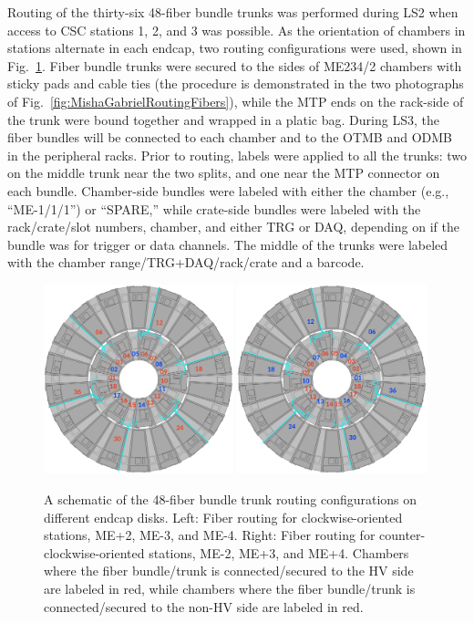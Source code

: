 Routing of the thirty-six 48-fiber bundle trunks was performed during LS2 when access to CSC stations 1, 2, and 3 was possible. As the orientation of chambers in stations alternate in each endcap, two routing configurations were used, shown in Fig.~\ref{fig:fiberrouting}. Fiber bundle trunks were secured to the sides of ME234/2 chambers with sticky pads and cable ties (the procedure is demonstrated in the two photographs of Fig.~\ref{fig:MishaGabrielRoutingFibers}), while the MTP ends on the rack-side of the trunk were bound together and wrapped in a platic bag. During LS3, the fiber bundles will be connected to each chamber and to the OTMB and ODMB in the peripheral racks. Prior to routing, labels were applied to all the trunks: two on the middle trunk near the two splits, and one near the MTP connector on each bundle. Chamber-side bundles were labeled with either the chamber (e.g., ``ME-1/1/1'') or ``SPARE,'' while crate-side bundles were labeled with the rack/crate/slot numbers, chamber, and either TRG or DAQ, depending on if the bundle was for trigger or data channels. The middle of the trunks were labeled with the chamber range/TRG+DAQ/rack/crate and a barcode.

\begin{figure}[H]
    \centering
    {\includegraphics[width=0.49\textwidth]{Images/Phase2Upgrades/OpticalFibers/FiberRouting1.png}}
    {\includegraphics[width=0.49\textwidth]{Images/Phase2Upgrades/OpticalFibers/FiberRouting2.png}}
    \caption{A schematic of the 48-fiber bundle trunk routing configurations on different endcap disks. Left: Fiber routing for clockwise-oriented stations, ME+2, ME-3, and ME-4. Right: Fiber routing for counter-clockwise-oriented stations, ME-2, ME+3, and ME+4. Chambers where the fiber bundle/trunk is connected/secured to the HV side are labeled in red, while chambers where the fiber bundle/trunk is connected/secured to the non-HV side are labeled in red.}
    \label{fig:fiberrouting}
\end{figure}

